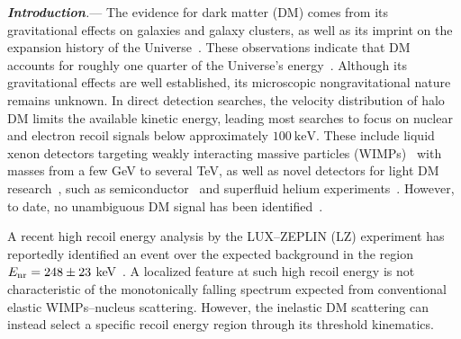 \documentclass[aps,twocolumn,prl,showpacs,showkeys,preprintnumbers,superscriptaddress,nobibnotes,floatfix,nofootinbib]{revtex4-2}
\newcommand{\prlsection}[2]{{\it\textbf{#1}{#2}}---}
\begin{document}
\prlsection{Introduction}{.} The evidence for dark matter (DM) comes from its gravitational effects on galaxies and galaxy clusters, as well as its imprint on the expansion history of the Universe~\cite{Rubin:1970zza,Clowe:2006eq,Planck:2018vyg}. These observations indicate that DM accounts for roughly one quarter of the Universe’s energy~\cite{Planck:2018vyg}. Although its gravitational effects are well established, its microscopic nongravitational nature remains unknown. In direct detection searches, the velocity distribution of halo DM limits the available kinetic energy, leading most searches to focus on nuclear and electron recoil signals below approximately \(100~\mathrm{keV}\). These include liquid xenon detectors targeting weakly interacting massive particles (WIMPs)~\cite{Lee:1977ua, Jungman:1995df} with masses from a few GeV to several TeV, as well as novel detectors for light DM research~\cite{Essig:2011nj,Essig:2015cda,Kouvaris:2016afs,Knapen:2017xzo,Bringmann:2018cvk,Alvey:2019zaa,Wang:2019jtk,Ge:2020yuf,Guo:2020oum,Kahn:2021ttr,Elor:2021swj,Arguelles:2022fqq,Alvey:2022pad,Su:2022wpj,PandaX:2023tfq,Su:2023zgr,Liang:2024xcx,Dutta:2024kuj,Bhattiprolu:2024dmh,Sun:2025gyj,Yang:2025ejt,Balan:2025uke,Gong:2025ves,Cheek:2025nul,Li:2025zwg,Ge:2025itf,Bernreuther:2025xqk,Hu:2025dsv,Cox:2025toz,Wang:2026you,Gong:2026dte}, such as semiconductor~\cite{SuperCDMS:2018mne, 2022PhRvD.106f2004A, CDEX:2023vvc, SENSEI:2023zdf, DAMIC-M:2025luv} and superfluid helium experiments~\cite{Schutz:2016tid,vonKrosigk:2022vnf,Hirschel:2023sbx,SPICE:2023tru,QUEST-DMC:2023nug}. However, to date, no unambiguous DM signal has been identified~\cite{XENON:2023cxc, PandaX:2024qfu, LZ:2024zvo,XENON:2025vwd}.

A recent high recoil energy analysis by the LUX–ZEPLIN (LZ) experiment has reportedly identified an event over the expected background in the region $E_{\rm nr} = 248 \pm 23$ keV~\cite{Akerib2026}. A localized feature at such high recoil energy is not characteristic of the monotonically falling spectrum expected from conventional elastic WIMPs--nucleus scattering. However, the inelastic DM scattering can instead select a specific recoil energy region through its threshold kinematics.
\end{document}
